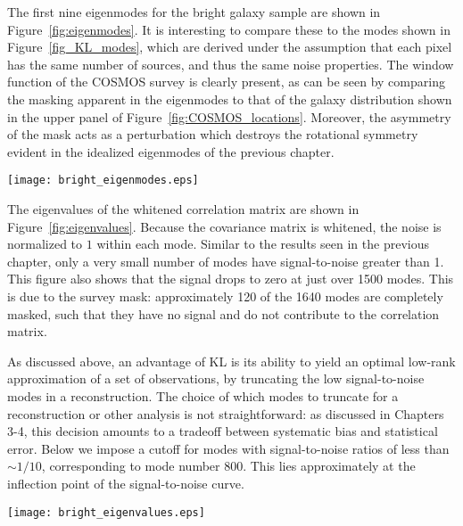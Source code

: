 The first nine eigenmodes for the bright galaxy sample
are shown in Figure~\ref{fig:eigenmodes}.
It is interesting to compare these to the modes shown in
Figure~\ref{fig_KL_modes}, which are derived under the assumption that
each pixel has the same number of sources, and thus the same noise properties.
The window function of the COSMOS survey is clearly present, as can be
seen by comparing the
masking apparent in the eigenmodes to that of the galaxy distribution
shown in the upper panel of Figure~\ref{fig:COSMOS_locations}.
Moreover, the asymmetry of the mask acts as a perturbation which destroys
the rotational symmetry evident in the idealized eigenmodes of
the previous chapter.

\begin{figure*}
 \centering
 \texttt{[image: bright\_eigenmodes.eps]}
 \caption{
   The first nine 2D KL signal-to-noise eigenmodes
   for the COSMOS bright objects.  This uses square pixels which are
   two arcminutes on a side, leading to $41 \times 40 = 1640$ pixels
   over the entire field.}
   \label{fig:eigenmodes}
\end{figure*}

The eigenvalues of the whitened correlation matrix are shown in
Figure~\ref{fig:eigenvalues}.  Because the covariance matrix is
whitened, the noise is normalized to $1$ within each mode.
Similar to the results seen in the previous chapter, only a very small
number of modes have signal-to-noise greater than 1.
This figure also shows that the signal drops to zero at just over 1500
modes.  This is due to the survey mask: approximately 120 of the 1640
modes are completely masked, such that they have no signal and do not
contribute to the correlation matrix.

As discussed above, an advantage of KL is its ability to yield an optimal
low-rank approximation of a set of observations, by truncating the low
signal-to-noise modes in a reconstruction.  The choice of which modes to
truncate for a reconstruction or other analysis is not straightforward:
as discussed in Chapters 3-4, this decision amounts to a tradeoff between
systematic bias and statistical error.  Below we impose a cutoff for
modes with signal-to-noise ratios of less than $\sim 1/10$, corresponding to
mode number 800.  This lies approximately at the inflection point of the
signal-to-noise curve.

\begin{figure*}
 \centering
 \texttt{[image: bright\_eigenvalues.eps]}
 \caption{
   The distribution of KL eigenvalues for the eigenmodes shown
   in Figure~\ref{fig:eigenmodes}.}
   \label{fig:eigenvalues}
\end{figure*}

